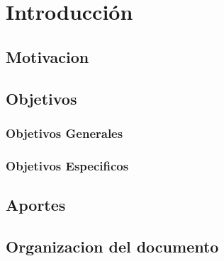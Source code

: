 \chapter{Introducción}
\label{capitulo1}

\section{Motivacion}
\label{capitulo1:Motivacion}

\section{Objetivos}
\label{capitulo1:Objetivos}

\subsection{Objetivos Generales}
\label{capitulo1:Objetivos_Generales}

\subsection{Objetivos Especificos}
\label{capitulo1:Objetivos_Especificos}

\section{Aportes}
\label{capitulo1:Aportes}

\section{Organizacion del documento}
\label{capitulo1:Organizacion_del_documento}